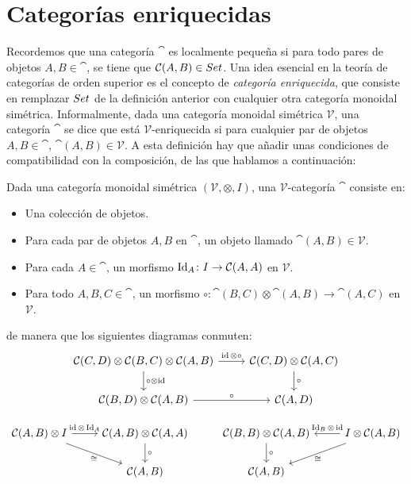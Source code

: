 \section{Categorías enriquecidas}
Recordemos que una categoría $\cat$ es localmente pequeña si para todo pares de objetos $A, B \in \cat$, se tiene que ${\mathcal{C}}(A,B) \in {Set}$.
Una idea esencial en la teoría de categorías de orden superior es el concepto de \emph{categoría enriquecida}, que consiste en remplazar ${Set}$ de la definición anterior con cualquier otra categoría monoidal simétrica.
Informalmente, dada una categoría monoidal simétrica $\mathcal{V}$, una categoría $\cat$ se dice que está $\mathcal{V}$-enriquecida si para cualquier par de objetos $A, B \in \cat$, $\cat(A, B) \in \mathcal{V}$.
A esta definición hay que añadir unas condiciones de compatibilidad con la composición, de las que hablamos a continuación:

\begin{definition}
Dada una categoría monoidal simétrica $(\mathcal{V}, \otimes, I)$, una $\mathcal{V}$-categoría $\cat$ consiste en:
\begin{itemize}
  \item Una colección de objetos.
  \item Para cada par de objetos $A, B$ en $\cat$, un objeto llamado  $\cat(A,B) \in \mathcal{V}$.
  \item Para cada $A \in \cat$, un morfismo $\operatorname{Id}_A \colon I \to {\mathcal{C}}(A,A)$ en $\mathcal{V}$.
  \item Para todo $A, B, C \in \cat$, un morfismo $\circ \colon \cat(B,C) \otimes \cat(A,B) \to \cat(A,C)$ en $\mathcal{V}$.
\end{itemize}
de manera que los siguientes diagramas conmuten:
\[ \begin{tikzcd}
{\cat(C,D) \otimes \cat(B,C) \otimes \cat(A,B)} \arrow[r,"\id\otimes\circ"] \arrow[d,"\circ\otimes\id"]& {\cat(C,D) \otimes \cat(A,C)} \arrow[d,"\circ"]\\
{\cat(B,D) \otimes \cat(A,B)} \arrow[r,"\circ"] & {\cat(A,D)}
\end{tikzcd}\]

\[ \begin{tikzcd}
{\cat(A,B) \otimes I} \arrow[r,"\id\otimes\Id_A"] \arrow[dr,"\cong" below] & {\cat(A,B) \otimes \cat(A,A)} \arrow[d,"\circ"] & {\cat(B,B) \otimes \cat(A,B)} \arrow[d,"\circ"] & {I \otimes \cat(A,B)} \arrow[l,"\Id_B \otimes \id" above] \arrow[dl,"\cong" below]\\
& \cat(A,B) & \cat(A,B)
\end{tikzcd}\]
\end{definition}

